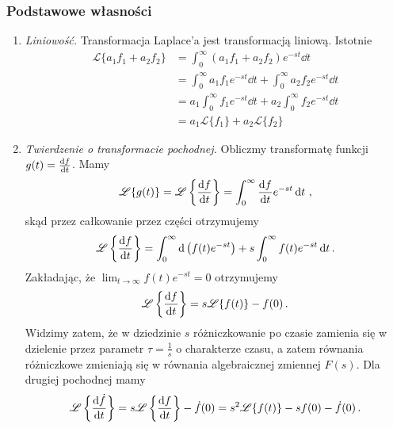 \documentclass[../main.tex]{subfiles}
\begin{document}
\subsubsection*{Podstawowe własności}
\begin{enumerate}
    \item \textit{Liniowość.} Transformacja Laplace'a jest transformacją liniową. Istotnie
    \begin{equation*}
    \begin{split}
        \mathscr{L}\{a_1f_1+a_2f_2\}&=\int_0^\infty(a_1f_1+a_2f_2)e^{-st}\dd{t}\\
        &=\int_0^\infty a_1f_1e^{-st}\dd{t}+\int_0^\infty a_2f_2e^{-st}\dd{t}\\
        &=a_1\int_0^\infty f_1e^{-st}\dd{t}+a_2\int_0^\infty f_2e^{-st}\dd{t}\\
        &=a_1\mathscr{L}\{f_1\}+a_2\mathscr{L}\{f_2\}
    \end{split}
    \end{equation*}
    
    \item \textit{Twierdzenie o transformacie pochodnej.} Obliczmy transformatę funkcji \(g(t)=\dv{f}{t}\). Mamy
    \begin{equation*}
        \mathscr{L}\{g(t)\}=\mathscr{L}\left\{\dv{f}{t}\right\}=\int_0^\infty \dv{f}{t}e^{-st}\dd{t}\,,
    \end{equation*}
    skąd przez całkowanie przez części otrzymujemy
    \begin{equation*}
        \mathscr{L}\left\{\dv{f}{t}\right\}=\int_0^\infty \dd\left(f(t)e^{-st}\right)+s\int_0^\infty f(t)e^{-st}\,\dd t\,.
    \end{equation*}
    Zakładając, że \(\lim_{t\to\infty}f(t)e^{-st}=0\) otrzymujemy
    \begin{equation*}
        \mathscr{L}\left\{\dv{f}{t}\right\}=s\mathscr{L}\{f(t)\}-f(0)\,.
    \end{equation*}
    Widzimy zatem, że w dziedzinie \(s\) różniczkowanie po czasie zamienia się w dzielenie przez parametr \(\tau=\frac{1}{s}\) o charakterze czasu, a zatem równania różniczkowe zmieniają się w równania algebraicznej zmiennej \(F(s)\). Dla drugiej pochodnej mamy
    \begin{equation*}
        \mathscr{L}\left\{\dv{\dot f}{t}\right\}=s\mathscr{L}\left\{\dv{f}{t}\right\}-\dot f(0)=s^2\mathscr{L}\{f(t)\}-sf(0)-\dot f(0)\,.
    \end{equation*}
\end{enumerate}
\end{document}
